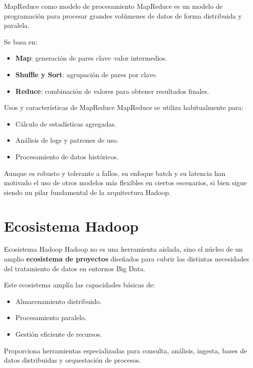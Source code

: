 \documentclass{beamer}
\begin{document}
\begin{frame}{MapReduce como modelo de procesamiento}
MapReduce es un modelo de programación para procesar grandes volúmenes de datos de forma distribuida y paralela.

Se basa en:
\begin{itemize}
    \item \textbf{Map}: generación de pares clave--valor intermedios.
    \item \textbf{Shuffle y Sort}: agrupación de pares por clave.
    \item \textbf{Reduce}: combinación de valores para obtener resultados finales.
\end{itemize}
\end{frame}

\begin{frame}{Usos y características de MapReduce}
MapReduce se utiliza habitualmente para:
\begin{itemize}
    \item Cálculo de estadísticas agregadas.
    \item Análisis de logs y patrones de uso.
    \item Procesamiento de datos históricos.
\end{itemize}

Aunque es robusto y tolerante a fallos, su enfoque batch y su latencia han motivado el uso de otros modelos más flexibles en ciertos escenarios, si bien sigue siendo un pilar fundamental de la arquitectura Hadoop.
\end{frame}


\section{Ecosistema Hadoop}

\begin{frame}{Ecosistema Hadoop}
Hadoop no es una herramienta aislada, sino el núcleo de un amplio \textbf{ecosistema de proyectos} diseñados para cubrir las distintas necesidades del tratamiento de datos en entornos Big Data.

Este ecosistema amplía las capacidades básicas de:
\begin{itemize}
    \item Almacenamiento distribuido.
    \item Procesamiento paralelo.
    \item Gestión eficiente de recursos.
\end{itemize}

Proporciona herramientas especializadas para consulta, análisis, ingesta, bases de datos distribuidas y orquestación de procesos.
\end{frame}
\end{document}

